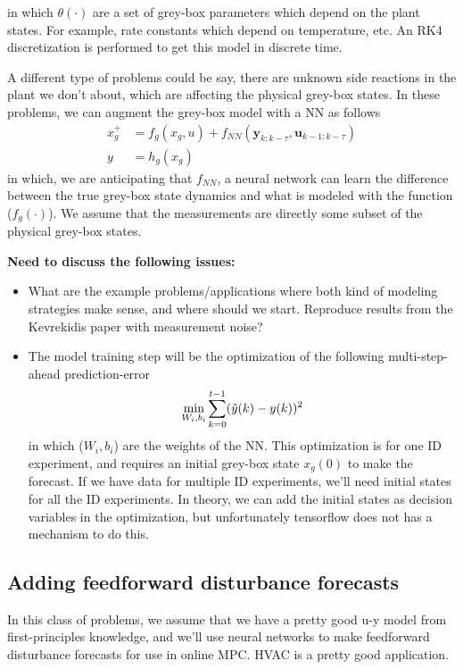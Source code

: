 \documentclass{article}
\begin{document}
in which $\theta(\cdot)$ are a set of grey-box parameters which 
depend on the plant states. For example, rate constants which 
depend on temperature, etc. An RK4 discretization is performed
to get this model in discrete time.

A different type of problems could be say, there are unknown
side reactions in the plant we don't about, which are affecting the 
physical grey-box 
states. In these problems, we can augment the grey-box 
model with a NN as follows
\begin{align*}
x_g^+ &= f_g(x_g, u) + f_{NN}(\mathbf{y}_{k:k-\tau}, \mathbf{u}_{k-1:k-\tau})\\
y &= h_g(x_g) 
\end{align*}
in which, we are anticipating that $f_{NN}$,
a neural network can learn the difference between the 
true grey-box state dynamics and what is modeled with 
the function ($f_g(\cdot)$). We assume that the measurements
are directly some subset of the physical grey-box states.

\textbf{Need to discuss the following issues:}
\begin{itemize}
  \item What are the example problems/applications 
  where both kind of modeling 
  strategies make sense, and where should we start.
  Reproduce results from the Kevrekidis paper with measurement 
  noise?
  \item The model training step will be the optimization of 
  the following multi-step-ahead prediction-error
  \begin{equation*}
    \underset{W_i, b_i}{\textnormal{min}} \sum_{k=0}^{t-1} (\hat{y}(k) - y(k))^2
  \end{equation*}
  in which ($W_i, b_i$) are the weights of the NN. This optimization 
  is for one ID experiment, and requires an initial grey-box 
  state $x_g(0)$ to make the forecast. If we have data 
  for multiple ID experiments, we'll need initial states for 
  all the ID experiments. In theory, we can add the initial 
  states as decision variables in the optimization, but 
  unfortunately tensorflow 
  does not has a mechanism to do this.
\end{itemize}

\subsection{Adding feedforward disturbance forecasts}
In this class of problems, we assume that we have a pretty 
good u-y model from first-principles knowledge, and we'll use 
neural networks to make feedforward disturbance forecasts
for use in online MPC. HVAC is a pretty good application.
\end{document}
